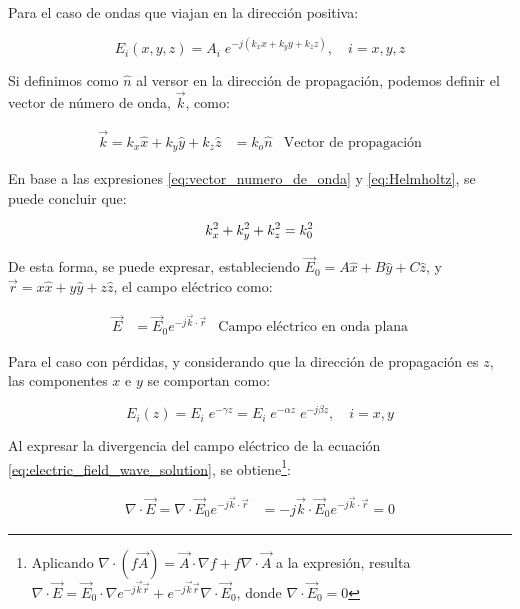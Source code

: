 Para el caso de ondas que viajan en la dirección positiva:

\begin{equation}
	E_i(x,y,z) = A_i \;e^{-j(k_x x + k_y y + k_z z)}, \quad i=x,y,z \nonumber
\end{equation}

Si definimos como $\hat{n}$ al versor en la dirección de propagación, podemos definir el vector de número de onda, $\vec{k}$, como:

\begin{align}
	\label{eq:vector_numero_de_onda}
	\vec{k} = k_x \hat{x} + k_y \hat{y} + k_z \hat{z} &= k_o \hat{n} & \text{Vector de propagación}
\end{align}

En base a las expresiones \ref{eq:vector_numero_de_onda} y \ref{eq:Helmholtz}, se puede concluir que:

\begin{equation}
\label{eq:numero_de_onda}
k_x^2 + k_y^2 + k_z^2 = k_0^2 \\
\end{equation}

De esta forma, se puede expresar, estableciendo $\vec{E}_0 = A \hat{x} + B \hat{y} + C \hat{z}$, y $\vec{r} = x \hat{x} + y \hat{y} + z \hat{z}$, el campo eléctrico como:

\begin{align}
	\label{eq:electric_field_wave_solution}
	\vec{E} &= \vec{E}_0 e^{-j\vec{k} \cdot \vec{r}} & \text{Campo eléctrico en onda plana}
\end{align}

Para el caso con pérdidas, y considerando que la dirección de propagación es $z$, las componentes $x$ e $y$ se comportan como:

\begin{equation}
E_i(z) = E_i \; e^{-\gamma z} = E_i \; e^{-\alpha z} \; e^{-j \beta z}, \quad i=x,y \nonumber
\end{equation}

Al expresar la divergencia del campo eléctrico de la ecuación \ref{eq:electric_field_wave_solution}, se obtiene\footnote{Aplicando $\nabla \cdot (f \vec{A}) = \vec{A} \cdot \nabla f + f \nabla \cdot \vec{A}$ a la expresión, resulta $\nabla \cdot \vec{E} = \vec{E}_0 \cdot \nabla e^{-j \vec{k} \vec{r}} + e^{-j \vec{k} \vec{r}}\nabla \cdot \vec{E}_0$, donde $\nabla \cdot \vec{E}_0 =0$}:


\begin{align}
	\nabla \cdot \vec{E} = \nabla \cdot \vec{E}_0 e^{-j\vec{k} \cdot \vec{r}} & = -j \vec{k} \cdot \vec{E}_0 e^{-j \vec{k} \cdot \vec{r}} = 0
\end{align}

